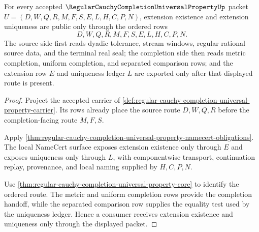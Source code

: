 \begin{theorem}
\label{thm:regular-cauchy-completion-universal-property-extension-uniqueness-handoff}
For every accepted $\RegularCauchyCompletionUniversalPropertyUp$ packet $U=(D,W,Q,R,M,F,S,E,L,H,C,P,N)$, extension existence and extension uniqueness are public only through the ordered rows
$$
D,W,Q,R,M,F,S,E,L,H,C,P,N .
$$
The source side first reads dyadic tolerance, stream windows, regular rational source data, and the terminal real seal; the completion side then reads metric completion, uniform completion, and separated comparison rows; and the extension row $E$ and uniqueness ledger $L$ are exported only after that displayed route is present.
\end{theorem}
\begin{proof}
Project the accepted carrier of \autoref{def:regular-cauchy-completion-universal-property-carrier}. Its rows already place the source route $D,W,Q,R$ before the completion-facing route $M,F,S$.

Apply \autoref{thm:regular-cauchy-completion-universal-property-namecert-obligations}. The local NameCert surface exposes extension existence only through $E$ and exposes uniqueness only through $L$, with componentwise transport, continuation replay, provenance, and local naming supplied by $H,C,P,N$.

Use \autoref{thm:regular-cauchy-completion-universal-property-core} to identify the ordered route. The metric and uniform completion rows provide the completion handoff, while the separated comparison row supplies the equality test used by the uniqueness ledger. Hence a consumer receives extension existence and uniqueness only through the displayed packet.
\end{proof}

